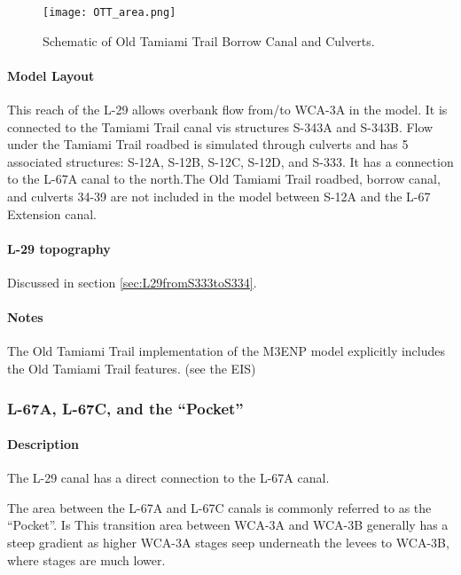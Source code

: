 \begin{figure}[!h]
  \begin{center}
  \texttt{[image: OTT\_area.png]}
  \caption{Schematic of Old Tamiami Trail Borrow Canal and Culverts.}
  \label{fig:OTT_area}
  \end{center}
\end{figure}

\paragraph{Model Layout}
This reach of the L-29 allows overbank flow from/to WCA-3A in the model. It is connected to the Tamiami Trail canal vis structures S-343A and S-343B. Flow under the Tamiami Trail roadbed is simulated through culverts  and has 5 associated structures: S-12A, S-12B, S-12C, S-12D, and S-333. It has a connection to the L-67A canal to the north.The Old Tamiami Trail roadbed, borrow canal, and culverts 34-39 are not included in the model between S-12A and the L-67 Extension canal.

\paragraph{L-29 topography}
Discussed in section \ref{sec:L29fromS333toS334}.

\begin{notes}
\paragraph{Notes}

The Old Tamiami Trail implementation of the M3ENP model explicitly includes the Old Tamiami Trail features. (see the EIS)
\end{notes}

\clearpage

\subsubsection{L-67A, L-67C, and the ``Pocket''}

\paragraph{Description}
The L-29 canal has a direct connection to the L-67A canal.

The area between the L-67A and L-67C canals is commonly referred to as the ``Pocket''. Is This transition area between WCA-3A and WCA-3B generally has a steep gradient as higher WCA-3A stages seep underneath the levees to WCA-3B, where stages are much lower.

